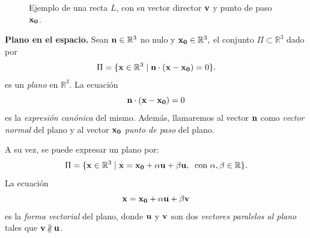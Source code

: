  \begin{figure}[H]
 \begin{center}
  \caption{Ejemplo de una recta $L$, con su vector director $\vect{v}$ y punto de paso $\vect{x_0}$.}
  \end{center}
\end{figure}

\begin{definition}{\textbf{Plano en el espacio.}}\label{plano}
  Sean    $\vect{n}\in\mathbb{R}^3$   no nulo  y  $\vect{x_0}\in\mathbb{R}^3,$  el conjunto $\Pi \subset \mathbb{R}^3 $  dado por 
    \begin{equation*}
      \Pi  = \{   \vect{x} \in\mathbb{R}^3  \;|\;    \vect{n}\cdot(\vect{x} - \vect{x_0}) =0   \}.
    \end{equation*} es un \textit{plano} en $\mathbb{R}^3$. La ecuaci\'on   $$ \vect{n}\cdot(\vect{x} - \vect{x_0}) =0$$  es la  \emph{expresi\'on canónica} del mismo.  Adem\'as, llamaremos al vector $\vect{n}$   como \emph{vector normal} del plano  y al vector  $\vect{x_0}$ \emph{punto de paso} del plano.   

    A su vez,  se puede expresar un plano por:
    \begin{equation*}
      \Pi  = \{   \vect{x} \in\mathbb{R}^3  \;|\;    \vect{x}=\vect{x_0}+\alpha \vect{u} + \beta \vect{u},  \:  \mbox{  con }  \alpha,\beta\in\mathbb{R}    \}.
    \end{equation*} La ecuación
    \begin{equation*}
       \vect{x}=\vect{x_0}+\alpha \vect{u} + \beta \vect{v}
    \end{equation*}
    es  la \emph{forma vectorial} del plano,  donde $\vect{u}$ y $\vect{v}$ son dos \emph{vectores paralelos al plano} tales que  $\vect{v}\nparallel\vect{u}$.
  \label{def:planoR3}
 \end{definition}

